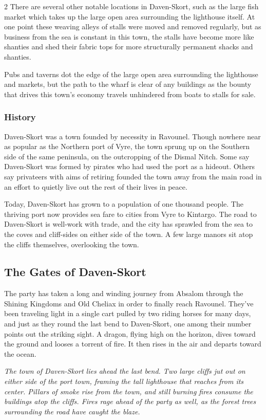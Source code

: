 \begin{multicols}{2}
  There are several other notable locations in Daven-Skort, such as the large fish market which takes up the large open area surrounding the lighthouse itself. At one point these weaving alleys of stalls were moved and removed regularly, but as business from the sea is constant in this town, the stalls have become more like shanties and shed their fabric tops for more structurally permanent shacks and shanties.

  Pubs and taverns dot the edge of the large open area surrounding the lighthouse and markets, but the path to the wharf is clear of any buildings as the bounty that drives this town's economy travels unhindered from boats to stalls for sale.

  \subsubsection{History}
  Daven-Skort was a town founded by necessity in Ravounel. Though nowhere near as popular as the Northern port of Vyre, the town sprung up on the Southern side of the same peninsula, on the outcropping of the Dismal Nitch. Some say Daven-Skort was formed by pirates who had used the port as a hideout. Others say privateers with aims of retiring founded the town away from the main road in an effort to quietly live out the rest of their lives in peace.

  Today, Daven-Skort has grown to a population of one thousand people. The thriving port now provides sea fare to cities from Vyre to Kintargo. The road to Daven-Skort is well-work with trade, and the city has sprawled from the sea to the coves and cliff-sides on either side of the town. A few large manors sit atop the cliffs themselves, overlooking the town.

  \subsection{The Gates of Daven-Skort}

  The party has taken a long and winding journey from Absalom through the Shining Kingdoms and Old Cheliax in order to finally reach Ravounel. They've been traveling light in a single cart pulled by two riding horses for many days, and just as they round the last bend to Daven-Skort, one among their number points out the striking sight. A dragon, flying high on the horizon, dives toward the ground and looses a torrent of fire. It then rises in the air and departs toward the ocean.

  \begin{pf-parchment}[\textcolor{title1}{Description}]
    \textcolor{title1}{\textit{The town of Daven-Skort lies ahead the last bend. Two large cliffs jut out on either side of the port town, framing the tall lighthouse that reaches from its center. Pillars of smoke rise from the town, and still burning fires consume the buildings atop the cliffs. Fires rage ahead of the party as well, as the forest trees surrounding the road have caught the blaze.}}
  \end{pf-parchment}


\end{multicols}
